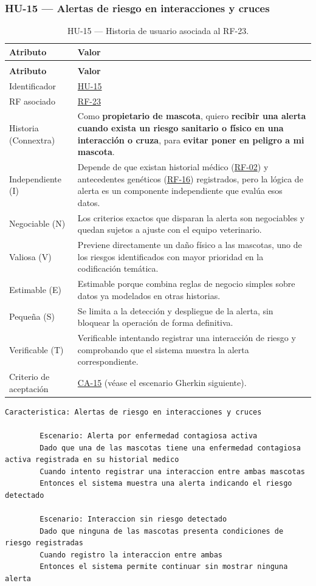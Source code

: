 \documentclass[journal,onecolumn]{IEEEtran}
\makeatletter
\newenvironment{atributos}[2]{%
	\small
	\begin{longtable}{@{}>{\raggedright\arraybackslash}p{4.2cm} >{\raggedright\arraybackslash}p{11.2cm}@{}}
		\caption{#2}\label{tab:#1}\\
		\toprule
		\textbf{Atributo} & \textbf{Valor} \\
		\midrule
		\endfirsthead
		\multicolumn{2}{@{}l}{\small\itshape (continuación)}\\
		\toprule
		\textbf{Atributo} & \textbf{Valor} \\
		\midrule
		\endhead
		\bottomrule
		\endlastfoot
	}{%
	\end{longtable}
	\normalsize
}
\makeatother
\begin{document}
	\subsubsection{HU-15 --- Alertas de riesgo en interacciones y cruces}
	
	\begin{atributos}{HU-15}{HU-15 --- Historia de usuario asociada al RF-23.}
		Identificador & \hyperref[tab:HU-15]{HU-15} \\
		RF asociado & \hyperref[tab:RF-23]{RF-23} \\
		Historia (Connextra) & Como \textbf{propietario de mascota}, quiero \textbf{recibir una alerta cuando exista un riesgo sanitario o físico en una interacción o cruza}, para \textbf{evitar poner en peligro a mi mascota}. \\
		Independiente (I) & Depende de que existan historial médico (\hyperref[tab:RF-02]{RF-02}) y antecedentes genéticos (\hyperref[tab:RF-16]{RF-16}) registrados, pero la lógica de alerta es un componente independiente que evalúa esos datos. \\
		Negociable (N) & Los criterios exactos que disparan la alerta son negociables y quedan sujetos a ajuste con el equipo veterinario. \\
		Valiosa (V) & Previene directamente un daño físico a las mascotas, uno de los riesgos identificados con mayor prioridad en la codificación temática. \\
		Estimable (E) & Estimable porque combina reglas de negocio simples sobre datos ya modelados en otras historias. \\
		Pequeña (S) & Se limita a la detección y despliegue de la alerta, sin bloquear la operación de forma definitiva. \\
		Verificable (T) & Verificable intentando registrar una interacción de riesgo y comprobando que el sistema muestra la alerta correspondiente. \\
		Criterio de aceptación & \hyperref[lst:ca15]{CA-15} (véase el escenario Gherkin siguiente). \\
	\end{atributos}
	
	\begin{lstlisting}[style=gherkin,caption={CA-15 --- Escenario de aceptación de la historia HU-15.},label={lst:ca15}]
		Caracteristica: Alertas de riesgo en interacciones y cruces
		
		Escenario: Alerta por enfermedad contagiosa activa
		Dado que una de las mascotas tiene una enfermedad contagiosa activa registrada en su historial medico
		Cuando intento registrar una interaccion entre ambas mascotas
		Entonces el sistema muestra una alerta indicando el riesgo detectado
		
		Escenario: Interaccion sin riesgo detectado
		Dado que ninguna de las mascotas presenta condiciones de riesgo registradas
		Cuando registro la interaccion entre ambas
		Entonces el sistema permite continuar sin mostrar ninguna alerta
	\end{lstlisting}
	
\end{document}
